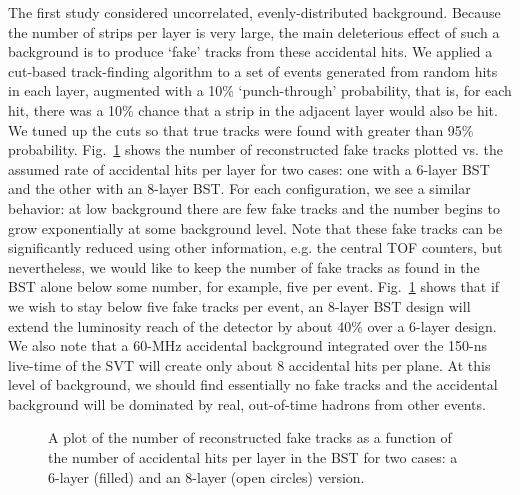 The first study considered uncorrelated, evenly-distributed background.
Because the number of strips per layer is very large, the main deleterious 
effect of such a background is to produce `fake' tracks from these accidental 
hits.  We applied a cut-based track-finding algorithm to a set of events 
generated from random hits in each layer, augmented with a 10\% 
`punch-through' probability, that is, for each hit, there was a 10\% chance 
that a strip in the adjacent layer would also be hit.  We tuned up the cuts 
so that true tracks were found with greater than 95\% probability.  
Fig.~\ref{fakes} shows the number of reconstructed fake tracks plotted vs. 
the assumed rate of accidental hits per layer for two cases: one with a 
6-layer BST and the other with an 8-layer BST.  For each configuration, we 
see a similar behavior: at low background there are few fake tracks and the 
number begins to grow exponentially at some background level.  Note that 
these fake tracks can be significantly reduced using other information, e.g. 
the central TOF counters, but nevertheless, we would like to keep the number 
of fake tracks as found in the BST alone below some number, for example, five
per event.  Fig.~\ref{fakes} shows that if we wish to stay below five fake 
tracks per event, an 8-layer BST design will extend the luminosity reach of 
the detector by about 40\% over a 6-layer design.  We also note that a 
60-MHz accidental background integrated over the 150-ns live-time of the SVT 
will create only about 8 accidental hits per plane.  At this level of 
background, we should find essentially no fake tracks and the accidental 
background will be dominated by real, out-of-time hadrons from other events.

\begin{figure}[htpb]
\vspace{7.8cm}
\caption{\small{A plot of the number of reconstructed fake tracks as a 
function of the number of accidental hits per layer in the BST for two 
cases: a 6-layer (filled) and an 8-layer (open circles) version.}}
\label{fakes}
\end{figure}

